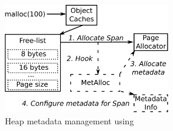 \begin{figure}[t]
\center
  \includegraphics[width=2.8in]{figs/metalloc-heap.eps}
  \caption{
  Heap metadata management using \projectname{}
  }
  \label{fig:metalloc-heap}
  \vspace{-1em}
\end{figure}


